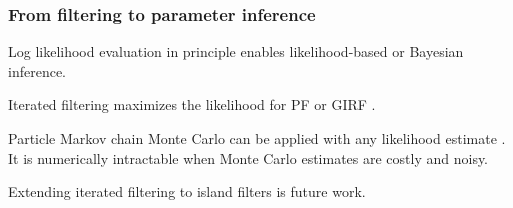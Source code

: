\documentclass{beamer}
\begin{document}
\begin{frame}
\frametitle{From filtering to parameter inference}

\begin{myitemize}
\item Log likelihood evaluation in principle enables likelihood-based or Bayesian inference.

\vspace{3mm}

\item Iterated filtering maximizes the likelihood for PF or GIRF \citep{ionides15}.

\vspace{3mm}

\item Particle Markov chain Monte Carlo can be applied with any likelihood estimate \citep{andrieu10}. It is numerically intractable when Monte Carlo estimates are costly and noisy.

\vspace{3mm}

\item Extending iterated filtering to island filters is future work.

\end{myitemize}

\end{frame}
\end{document}
